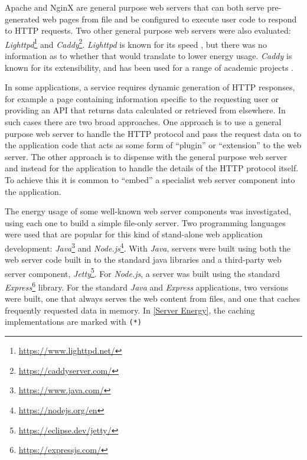 Apache and NginX are general purpose web servers that can both serve pre-generated web pages from file and be configured to execute user code to respond to HTTP requests. Two other general purpose web servers were also evaluated: \emph{Lighttpd}\footnote{\url{https://www.lighttpd.net/}} and \emph{Caddy}\footnote{\url{https://caddyserver.com/}}. \emph{Lighttpd} is known for its speed \citep{Bogus2008}, but there was no information as to whether that would translate to lower energy usage. \emph{Caddy} is known for its extensibility, and has been used for a range of academic projects \citep{OCallaghan2017} \citep{Ardi2021}.

In some applications, a service requires dynamic generation of HTTP responses, for example a page containing information specific to the requesting user or providing an API that returns data calculated or retrieved from elsewhere. In such cases there are two broad approaches. One approach is to use a general purpose web server to handle the HTTP protocol and pass the request data on to the application code that acts as some form of \enquote{plugin} or \enquote{extension} to the web server. The other approach is to dispense with the general purpose web server and instead  for the application to handle the details of the HTTP protocol itself. To achieve this it is common to \enquote{embed} a specialist web server component into the application.

The energy usage of some well-known web server components was investigated, using each one to build a simple file-only server. Two \gls{programming language}s were used that are popular for this kind of stand-alone web application development: \emph{Java}\footnote{\url{https://www.java.com/}} and \emph{Node.js}\footnote{\url{https://nodejs.org/en}}. With \emph{Java}, servers were built using both the web server code built in to the standard java libraries and a third-party web server component, \emph{Jetty}\footnote{\url{https://eclipse.dev/jetty/}}. For \emph{Node.js}, a server was built using the standard \emph{Express}\footnote{\url{https://expressjs.com/}} library. For the standard \emph{Java} and \emph{Express} applications, two versions were built, one that always serves the web content from files, and one that caches frequently requested data in memory. In \autoref{Server Energy}, the caching implementations are marked with \verb!(*)!

